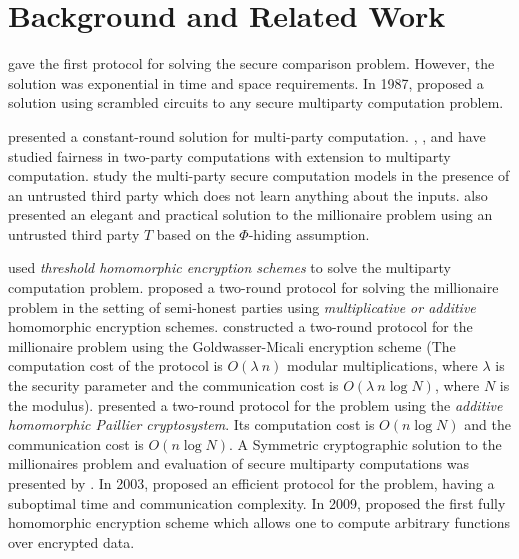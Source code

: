 \documentclass[11pt, letterpaper, romanappendices, onecolumn]{article}
\theoremstyle{plain}\newtheorem{thm}{Theorem}[section]
\theoremstyle{definition}
\theoremstyle{remark}
\begin{document}
\section{Background and Related Work} \label{sec2}
\citet{yao1982protocols} gave the first protocol for solving the secure comparison problem. However, the solution was exponential in time and space requirements. In 1987, \citet{goldreich1987play} proposed a solution using scrambled circuits to any secure multiparty computation problem.

\par \citet{beaver1990round} presented a constant-round solution for multi-party computation. \citet{crypto19871119},  \citet{beaver1990multiparty}, and \citet{goldwasser1991fair} have studied fairness in two-party computations with extension to multiparty computation. \citet{feige1994minimal} study the multi-party secure computation models in the presence of an untrusted third party which does not learn anything about the inputs. \citet{cachin1999efficient} also presented an elegant and practical solution to the millionaire problem using an untrusted third party $T$ based on the $\Phi$-hiding assumption.

\par \citet{schoenmakers2004practical} used \textit{threshold homomorphic encryption schemes} to solve the multiparty computation problem. \citet{lin2005efficient} proposed a two-round protocol for solving the millionaire problem in the setting of semi-honest parties using \textit{multiplicative or additive} homomorphic encryption schemes. \citet{fischlin2001cost} constructed a two-round protocol for the millionaire problem using the Goldwasser-Micali encryption scheme (The computation cost of the protocol is $O(\lambda~n)$ modular multiplications, where $\lambda$ is the security parameter and the communication cost is $O(\lambda~n \log N)$, where $N$ is the modulus). \citet{blake2004strong} presented a two-round protocol for the problem using the \textit{additive homomorphic Paillier cryptosystem}. Its computation cost is $O(n \log N)$ and the communication cost is $O(n \log N)$. A Symmetric cryptographic solution to the millionaires problem and evaluation of secure multiparty computations was presented by \citet{shundong2008symmetric}. In 2003, \citet{ioannidis2003efficient} proposed an efficient protocol for the problem, having a suboptimal time and communication complexity. In 2009, \citet{gentry2009fully} proposed the first fully homomorphic encryption scheme which allows one to compute arbitrary functions over encrypted data.
\end{document}
